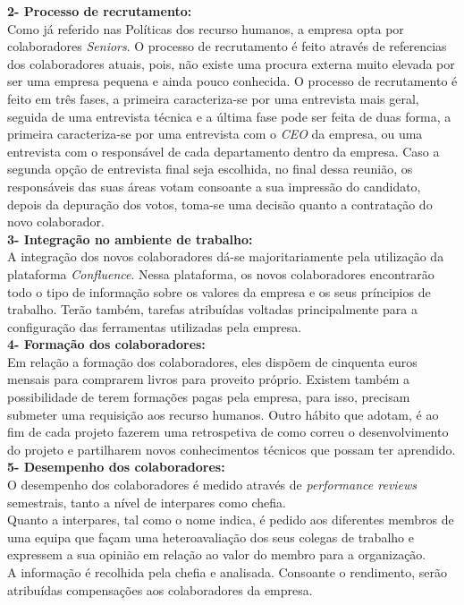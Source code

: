 \noindent \textbf{2- Processo de recrutamento:}\\
Como já referido nas Políticas dos recurso humanos, a empresa opta por colaboradores \textit{Seniors}. O processo de recrutamento é feito através de referencias dos colaboradores atuais, pois,  não existe uma procura externa muito elevada por ser uma empresa pequena e ainda pouco conhecida. O processo de recrutamento é feito em três fases, a primeira caracteriza-se por uma entrevista mais geral, seguida de uma entrevista técnica e a última fase pode ser feita de duas forma, a primeira caracteriza-se por uma entrevista com o \textit{CEO} da empresa, ou uma entrevista com o responsável de cada departamento dentro da empresa. Caso a segunda opção de entrevista final seja escolhida, no final dessa reunião, os responsáveis das suas áreas votam consoante a sua impressão do candidato, depois da depuração dos votos, toma-se uma decisão quanto a contratação do novo colaborador.\\

\noindent \textbf{3- Integração no ambiente de trabalho:}\\
A integração dos novos colaboradores dá-se majoritariamente pela utilização da plataforma \textit{Confluence}. Nessa plataforma, os novos colaboradores encontrarão todo o tipo de informação sobre os valores da empresa e os seus príncipios de trabalho. Terão também, tarefas atribuídas voltadas principalmente para a configuração das ferramentas utilizadas pela empresa. \\

\noindent \textbf{4- Formação dos colaboradores:}\\
Em relação a formação dos colaboradores, eles dispõem de cinquenta euros mensais para comprarem livros para proveito próprio. Existem também a possibilidade de terem formações pagas pela empresa, para isso, precisam submeter uma requisição aos recurso humanos. Outro hábito que adotam, é ao fim de cada projeto fazerem uma retrospetiva de como correu o desenvolvimento do projeto e partilharem novos conhecimentos técnicos que possam ter aprendido.\\

\noindent \textbf{5- Desempenho dos colaboradores:}\\
O desempenho dos colaboradores é medido através de \textit{performance reviews} semestrais, tanto a nível de interpares como chefia.\\
Quanto a interpares, tal como o nome indica, é pedido aos diferentes membros de uma equipa que façam uma heteroavaliação dos seus colegas de trabalho e expressem a sua opinião em relação ao valor do membro para a organização.\\ 
A informação é recolhida pela chefia e analisada. Consoante o rendimento, serão atribuídas compensações aos colaboradores da empresa.\\


